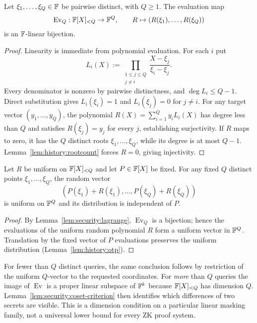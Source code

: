 \begin{lemma}\label{lem:security:lagrange}
Let $\xi_1,\ldots,\xi_Q\in\mathbb{F}$ be pairwise distinct, with $Q\geq1$. The evaluation map
\[
 \operatorname{Ev}_Q:\mathbb{F}[X]_{<Q}\to\mathbb{F}^Q,\qquad
 R\mapsto (R(\xi_1),\ldots,R(\xi_Q))
\]
is an $\mathbb{F}$-linear bijection.
\end{lemma}
\begin{proof}
Linearity is immediate from polynomial evaluation. For each $i$ put
\[
 L_i(X):=\prod_{\substack{1\leq j\leq Q\\j\ne i}}
     \frac{X-\xi_j}{\xi_i-\xi_j}.
\]
Every denominator is nonzero by pairwise distinctness, and $\deg L_i\leq Q-1$. Direct substitution gives $L_i(\xi_i)=1$ and $L_i(\xi_j)=0$ for $j\ne i$. For any target vector $(y_1,\ldots,y_Q)$, the polynomial $R(X)=\sum_{i=1}^Qy_iL_i(X)$ has degree less than $Q$ and satisfies $R(\xi_j)=y_j$ for every $j$, establishing surjectivity. If $R$ maps to zero, it has the $Q$ distinct roots $\xi_1,\ldots,\xi_Q$, while its degree is at most $Q-1$. Lemma~\ref{lem:history:rootcount} forces $R=0$, giving injectivity.
\end{proof}

\begin{corollary}\label{cor:security:q-query-uniform}
Let $R$ be uniform on $\mathbb{F}[X]_{<Q}$ and let $P\in\mathbb{F}[X]$ be fixed. For any fixed $Q$ distinct points $\xi_1,\ldots,\xi_Q$, the random vector
\[
 (P(\xi_1)+R(\xi_1),\ldots,P(\xi_Q)+R(\xi_Q))
\]
is uniform on $\mathbb{F}^Q$ and its distribution is independent of $P$.
\end{corollary}
\begin{proof}
By Lemma~\ref{lem:security:lagrange}, $\operatorname{Ev}_Q$ is a bijection; hence the evaluations of the uniform random polynomial $R$ form a uniform vector in $\mathbb{F}^Q$. Translation by the fixed vector of $P$ evaluations preserves the uniform distribution (Lemma~\ref{lem:history:otp}).
\end{proof}

\begin{remark}
For fewer than $Q$ distinct queries, the same conclusion follows by restriction of the uniform $Q$-vector to the requested coordinates. For \emph{more} than $Q$ queries the image of $\operatorname{Ev}$ is a proper linear subspace of $\mathbb{F}^k$ because $\mathbb{F}[X]_{<Q}$ has dimension $Q$. Lemma~\ref{lem:security:coset-criterion} then identifies which differences of two secrets are visible. This is a dimension condition on a particular linear masking family, not a universal lower bound for every ZK proof system.
\end{remark}
